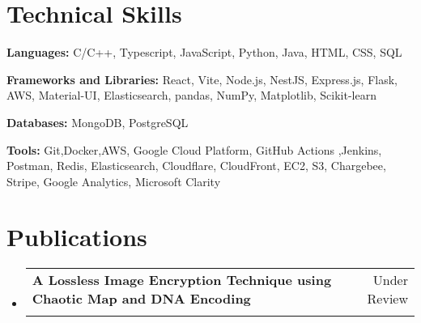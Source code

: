 \documentclass[a4paper,11pt]{article}
\makeatletter
\newcommand{\resumeSubheading}[4]{
    \vspace{-2pt}\item
    \begin{tabular*}{0.97\textwidth}[t]{l@{\extracolsep{\fill}}r}
        \textbf{#1} & #2 \\
        \textit{\small#3} & \textit{\small #4} \\
    \end{tabular*}\vspace{-7pt}
}
\newcommand{\resumeSubHeadingListStart}{\begin{itemize}[leftmargin=0.15in, label={}]}
\newcommand{\resumeSubHeadingListEnd}{\end{itemize}}
\makeatother
\begin{document}
\section{Technical Skills}
\begin{itemize}[leftmargin=0.15in, label={}, itemsep=0pt, parsep=0pt]
	\small{
	\item{
	      \textbf{Languages:} C/C++, Typescript, JavaScript, Python, Java, HTML, CSS, SQL
	      }
	\item{
	      \textbf{Frameworks and Libraries:} React, Vite, Node.js, NestJS, Express.js, Flask, AWS, Material-UI, Elasticsearch, pandas, NumPy, Matplotlib, Scikit-learn
	      }
	\item{
	      \textbf{Databases:} MongoDB, PostgreSQL
	      }
	\item{
	      \textbf{Tools:} Git,Docker,AWS, Google Cloud Platform, GitHub Actions ,Jenkins, Postman, Redis, Elasticsearch, Cloudflare, CloudFront, EC2, S3, Chargebee, Stripe, Google Analytics, Microsoft Clarity
	      }

	      }
\end{itemize}

\section{Publications}
\resumeSubHeadingListStart
\resumeSubheading
{A Lossless Image Encryption Technique using Chaotic Map and DNA Encoding}{Under Review}
{}{}
\resumeSubHeadingListEnd
\end{document}
